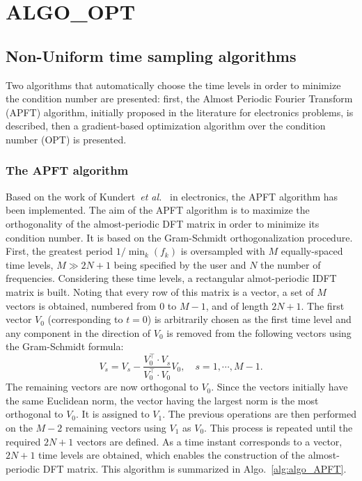 \chapter{ALGO_OPT}
\label{algo_opt}


\section{Non-Uniform time sampling algorithms}
\label{sec:time-sampling}

Two algorithms that automatically choose the time levels in order to
minimize the condition number are presented: first, the Almost
Periodic Fourier Transform (APFT) algorithm, initially proposed in the
 literature for electronics problems, is described, then a gradient-based
optimization algorithm over the condition number (OPT) is presented.


\subsection{The APFT algorithm}
\label{sec:apft-algorithm}

Based on the work of Kundert~\emph{et al.}~\cite{Kundert1988} in
electronics, the APFT algorithm has been implemented.  The aim of the
APFT algorithm is to maximize the orthogonality of the almost-periodic
DFT matrix in order to minimize its condition number.  It is based on
the Gram-Schmidt orthogonalization procedure.  First, the greatest
period $1/\min_k(f_k)$ is oversampled with $M$ equally-spaced time
levels, $M\gg2N+1$ being specified by the user and $N$ the number of
frequencies. Considering these time levels, a rectangular
almot-periodic IDFT matrix is built. Noting that every row of this
matrix is a vector, a set of $M$ vectors is obtained, numbered from 0
to $M-1$, and of length $2N+1$. The first vector $V_0$ (corresponding
to $t=0$) is arbitrarily chosen as the first time level and any
component in the direction of $V_0$ is removed from the following
vectors using the Gram-Schmidt formula:
\begin{equation}
   V_s = V_s - \frac{V_0^\top \cdot V_s}{V_0^\top \cdot V_0} V_0, \quad s=1,\cdots,M-1.
   \label{GramSchmidtAlgo}
\end{equation}
The remaining vectors are now orthogonal to $V_0$.  Since the vectors initially have the same Euclidean norm, the vector having the largest
norm is the most orthogonal to $V_0$.  It is assigned to $V_1$. The previous
operations are then performed on the $M-2$ remaining vectors using $V_1$
as $V_0$. This process is repeated until the required $2N+1$ vectors
are defined. As a time instant corresponds to a vector, $2N+1$ time levels are obtained, which enables the construction of the almost-periodic
DFT matrix. This algorithm is summarized in
Algo.~\ref{alg:algo_APFT}. %

